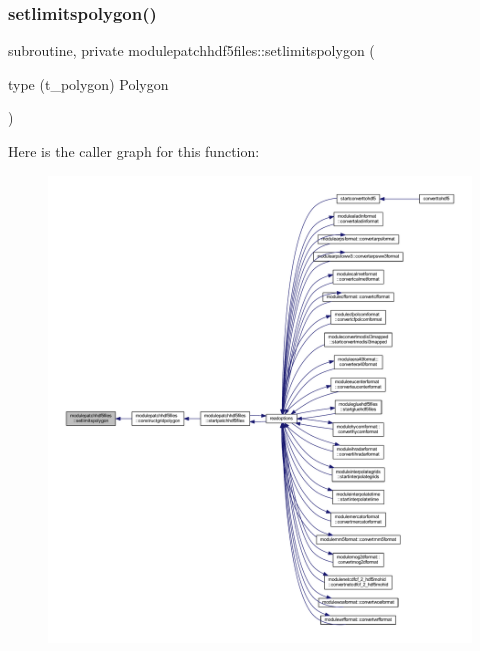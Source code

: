 \subsubsection{\texorpdfstring{setlimitspolygon()}{setlimitspolygon()}}
{\footnotesize\ttfamily subroutine, private modulepatchhdf5files\+::setlimitspolygon (\begin{DoxyParamCaption}\item[{type (t\+\_\+polygon)}]{Polygon }\end{DoxyParamCaption})\hspace{0.3cm}{\ttfamily [private]}}

Here is the caller graph for this function\+:\nopagebreak
\begin{figure}[H]
\begin{center}
\leavevmode
\includegraphics[width=350pt]{namespacemodulepatchhdf5files_aaa235a83ab0f98b8c034c89125019a93_icgraph}
\end{center}
\end{figure}
\mbox{\label{namespacemodulepatchhdf5files_a3b72c3b4723946c225c3539103a6662e}} 
